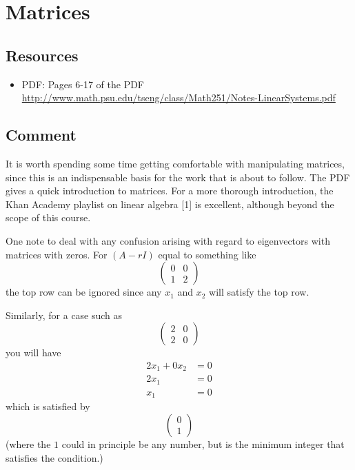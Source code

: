 \section{Matrices}

\subsection*{Resources}
\begin{itemize}
    \item PDF: Pages 6-17 of the PDF \url{http://www.math.psu.edu/tseng/class/Math251/Notes-LinearSystems.pdf}
\end{itemize}

\subsection*{Comment}
It is worth spending some time getting comfortable with manipulating matrices, since this is an indispensable basis for the work that is about to follow. The PDF gives a quick introduction to matrices. For a more thorough introduction, the Khan Academy playlist on linear algebra [1] is excellent, although beyond the scope of this course.

One note to deal with any confusion arising with regard to eigenvectors with matrices with zeros. For $(A-rI)$ equal to something like
\begin{equation}
\left(
    \begin{array}{cc}
        0 & 0 \\
        1 & 2
    \end{array}
\right)
\end{equation}
the top row can be ignored since any $x_1$ and $x_2$ will satisfy the top row.

Similarly, for a case such as
\begin{equation}
\left(
    \begin{array}{cc}
        2 & 0 \\
        2 & 0
    \end{array}
\right)
\end{equation}
you will have
\begin{align}
    2 x_1 + 0 x_2 &= 0 \\
    2 x_1 &= 0 \\
    x_1 &= 0
\end{align}
which is satisfied by
\begin{equation}
\left(
    \begin{array}{c}
        0 \\
        1
    \end{array}
\right)
\end{equation}
(where the $1$ could in principle be any number, but is the minimum integer that satisfies the condition.)

